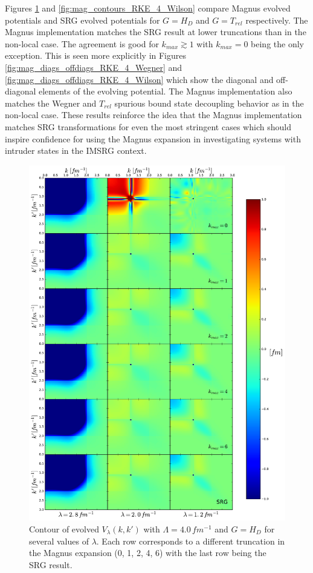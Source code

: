 \documentclass[preprintnumbers,floatfix,aps,prc,preprint]{revtex4-1}
\begin{document}
%
Figures \ref{fig:mag_contours_RKE_4_Wegner} and \ref{fig:mag_contours_RKE_4_Wilson} compare Magnus evolved potentials and SRG evolved potentials for $G=H_D$ and $G=T_{rel}$ respectively. The Magnus implementation matches the SRG result at lower truncations than in the non-local case. The agreement is good for $k_{max} \gtrsim 1$ with $k_{max}=0$ being the only exception. This is seen more explicitly in Figures \ref{fig:mag_diags_offdiags_RKE_4_Wegner} and \ref{fig:mag_diags_offdiags_RKE_4_Wilson} which show the diagonal and off-diagonal elements of the evolving potential. The Magnus implementation also matches the Wegner and $T_{rel}$ spurious bound state decoupling behavior as in the non-local case. These results reinforce the idea that the Magnus implementation matches SRG transformations for even the most stringent cases which should inspire confidence for using the Magnus expansion in investigating systems with intruder states in the IMSRG context.
%
\begin{figure}[H]
  \centering
  \includegraphics[width=15cm]{mag_contours_RKE_4_Wegner}
   \hspace*{0.05\textwidth}%
  \caption{Contour of evolved $V_{\lambda}(k,k')$ with $\Lambda=4.0\,fm^{-1}$ and $G=H_{D}$ for several values of $\lambda$. Each row corresponds to a different truncation in the Magnus expansion (0, 1, 2, 4, 6) with the last row being the SRG result.}
  \label{fig:mag_contours_RKE_4_Wegner}
\end{figure}
\end{document}
